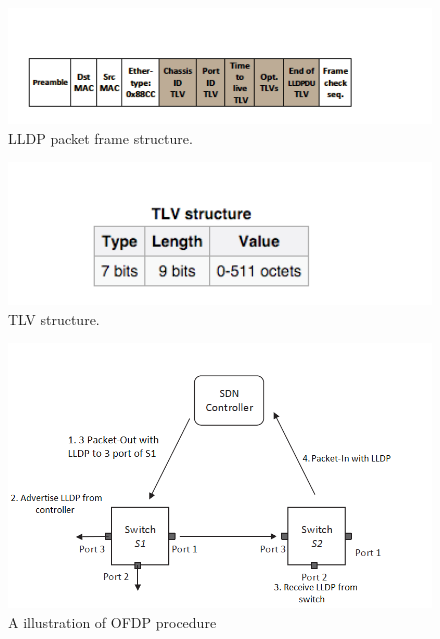 \begin{figure}[H]
\begin{center} 
\includegraphics[width=1\textwidth]{figures/LLDP_packet_format.png}
\end{center}
\caption{LLDP packet frame structure. \cite{LLDP_WS}}
\label{LLDP_frame}
\end{figure}

\begin{figure}[H]
\begin{center} 
\includegraphics[width=1\textwidth]{figures/TLV_structure.png}
\end{center}
\caption{TLV structure. \cite{LLDP_WS}}
\label{TLV}
\end{figure}

\begin{figure}[H]
\begin{center} 
\includegraphics[width=1\textwidth]{figures/OFDP_procedure.png}
\end{center}
\caption{A illustration of OFDP procedure}
\label{OFDP}
\end{figure}

